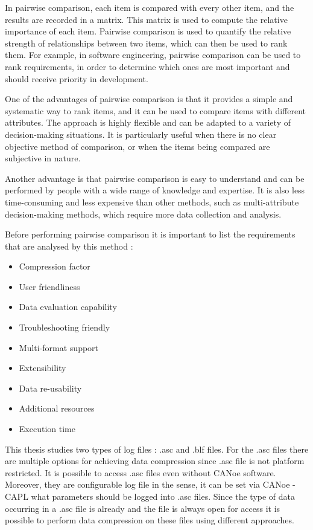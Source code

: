 In pairwise comparison, each item is compared with every other item, and the results are recorded in a matrix. This matrix is used to compute the relative importance of each item. Pairwise comparison is used to quantify the relative strength of relationships between two items, which can then be used to rank them. For example, in software engineering, pairwise comparison can be used to rank requirements, in order to determine which ones are most important and should receive priority in development.

One of the advantages of pairwise comparison is that it provides a simple and systematic way to rank items, and it can be used to compare items with different attributes. The approach is highly flexible and can be adapted to a variety of decision-making situations. It is particularly useful when there is no clear objective method of comparison, or when the items being compared are subjective in nature.

Another advantage is that pairwise comparison is easy to understand and can be performed by people with a wide range of knowledge and expertise. It is also less time-consuming and less expensive than other methods, such as multi-attribute decision-making methods, which require more data collection and analysis.

Before performing pairwise comparison it is important to list the requirements that are analysed by this method : 

\begin{itemize}
    \item Compression factor 
    \item User friendliness  
    \item Data evaluation capability 
    \item Troubleshooting friendly 
    \item Multi-format support 
    \item Extensibility  
    \item Data re-usability 
    \item Additional resources
    \item Execution time
\end{itemize}

This thesis studies two types of log files : .asc and .blf files. For the .asc files there are multiple options for achieving data compression since .asc file is not platform restricted. It is possible to access .asc files even without CANoe software. Moreover, they are configurable log file in the sense, it can be set via CANoe - CAPL what parameters should be logged into .asc files. Since the type of data occurring in a .asc file is already and the file is always open for access it is possible to perform data compression on these files using different approaches. 

